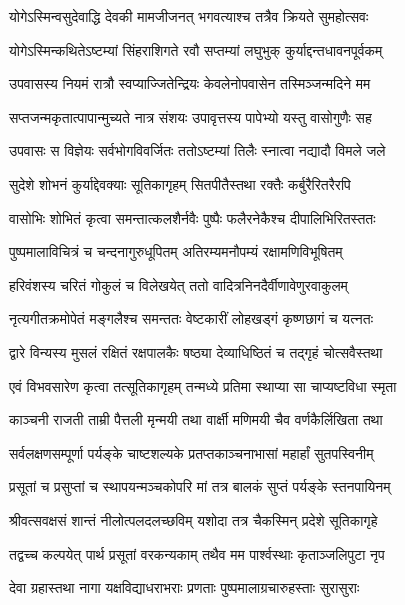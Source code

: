 \twolineshloka
{योगेऽस्मिन्वसुदेवाद्धि देवकी मामजीजनत्}
{भगवत्याश्च तत्रैव क्रियते सुमहोत्सवः}%

\twolineshloka
{योगेऽस्मिन्कथितेऽष्टम्यां सिंहराशिगते रवौ}
{सप्तम्यां लघुभुक् कुर्याद्दन्तधावनपूर्वकम्}%

\twolineshloka
{उपवासस्य नियमं रात्रौ स्वप्याज्जितेन्द्रियः}
{केवलेनोपवासेन तस्मिञ्जन्मदिने मम}%

\twolineshloka
{सप्तजन्मकृतात्पापान्मुच्यते नात्र संशयः}
{उपावृत्तस्य पापेभ्यो यस्तु वासोगुणैः सह}%

\twolineshloka
{उपवासः स विज्ञेयः सर्वभोगविवर्जितः}
{ततोऽष्टम्यां तिलैः स्नात्वा नद्यादौ विमले जले}%

\twolineshloka
{सुदेशे शोभनं कुर्याद्देवक्याः सूतिकागृहम्}
{सितपीतैस्तथा रक्तैः कर्बुरैरितरैरपि}%

\twolineshloka
{वासोभिः शोभितं कृत्वा समन्तात्कलशैर्नवैः}
{पुष्पैः फलैरनेकैश्च दीपालिभिरितस्ततः}%

\twolineshloka
{पुष्पमालाविचित्रं च चन्दनागुरुधूपितम्}
{अतिरम्यमनौपम्यं रक्षामणिविभूषितम्}%

\twolineshloka
{हरिवंशस्य चरितं गोकुलं च विलेखयेत्}
{ततो वादित्रनिनदैर्वीणावेणुरवाकुलम्}%

\twolineshloka
{नृत्यगीतक्रमोपेतं मङ्गलैश्च समन्ततः}
{वेष्टकारीं लोहखड्गं कृष्णछागं च यत्नतः}%

\twolineshloka
{द्वारे विन्यस्य मुसलं रक्षितं रक्षपालकैः}
{षष्ठ्या देव्याधिष्ठितं च तद्गृहं चोत्सवैस्तथा}%

\twolineshloka
{एवं विभवसारेण कृत्वा तत्सूतिकागृहम्}
{तन्मध्ये प्रतिमा स्थाप्या सा चाप्यष्टविधा स्मृता}%

\twolineshloka
{काञ्चनी राजती ताम्री पैत्तली मृन्मयी तथा}
{वार्क्षी मणिमयी चैव वर्णकैर्लिखिता तथा}%

\twolineshloka
{सर्वलक्षणसम्पूर्णा पर्यङ्के चाष्टशल्यके}
{प्रतप्तकाञ्चनाभासां महार्हां सुतपस्विनीम्}%

\twolineshloka
{प्रसूतां च प्रसुप्तां च स्थापयन्मञ्चकोपरि}
{मां तत्र बालकं सुप्तं पर्यङ्के स्तनपायिनम्}%

\twolineshloka
{श्रीवत्सवक्षसं शान्तं नीलोत्पलदलच्छविम्}
{यशोदा तत्र चैकस्मिन् प्रदेशे सूतिकागृहे}%

\twolineshloka
{तद्वच्च कल्पयेत् पार्थ प्रसूतां वरकन्यकाम्}
{तथैव मम पार्श्वस्थाः कृताञ्जलिपुटा नृप}%

\twolineshloka
{देवा ग्रहास्तथा नागा यक्षविद्याधराभराः}
{प्रणताः पुष्पमालाग्रचारुहस्ताः सुरासुराः}%

